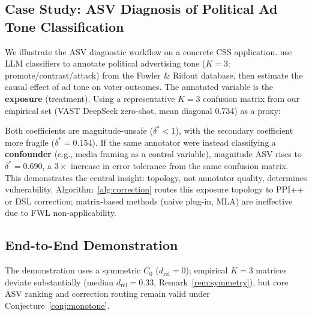 \subsection{Case Study: ASV Diagnosis of Political Ad Tone Classification}
\label{sec:asv_case_study}

We illustrate the ASV diagnostic workflow on a concrete CSS application. \citet{egami_hinck_stewart_wei2023} use LLM classifiers to annotate political advertising tone ($K{=}3$: promote/contrast/attack) from the Fowler \& Ridout database, then estimate the causal effect of ad tone on voter outcomes. The annotated variable is the \textbf{exposure} (treatment). Using a representative $K{=}3$ confusion matrix from our empirical set (VAST DeepSeek zero-shot, mean diagonal 0.734) as a proxy:

\begin{center}
\small
{}
\end{center}

Both coefficients are magnitude-unsafe ($\delta^* < 1$), with the secondary coefficient more fragile ($\delta^*{=}0.154$). If the same annotator were instead classifying a \textbf{confounder} (e.g., media framing as a control variable), magnitude ASV rises to $\delta^*{=}0.690$, a $3{\times}$ increase in error tolerance from the same confusion matrix. This demonstrates the central insight: topology, not annotator quality, determines vulnerability. Algorithm~\ref{alg:correction} routes this exposure topology to PPI++ or DSL correction; matrix-based methods (naive plug-in, MLA) are ineffective due to FWL non-applicability.

\subsection{End-to-End Demonstration}
\label{sec:e2e_demo}



The demonstration uses a symmetric $C_0$ ($d_{\mathrm{rel}}{=}0$); empirical $K{=}3$ matrices deviate substantially (median $d_{\mathrm{rel}}{=}0.33$, Remark~\ref{rem:symmetry}), but core ASV ranking and correction routing remain valid under Conjecture~\ref{conj:monotone}.

